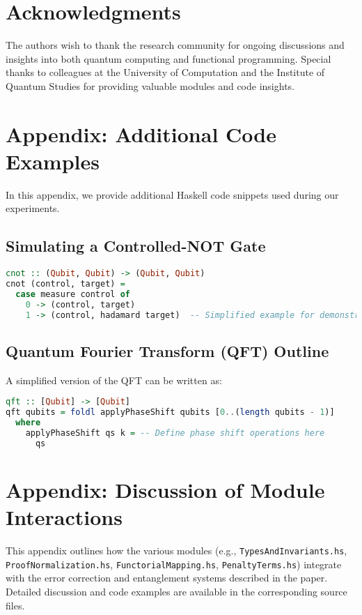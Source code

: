 \documentclass[12pt]{article}
\begin{document}
\section*{Acknowledgments}
The authors wish to thank the research community for ongoing discussions and insights into both quantum computing and functional programming. Special thanks to colleagues at the University of Computation and the Institute of Quantum Studies for providing valuable modules and code insights.





\newpage
\appendix

\section{Appendix: Additional Code Examples}
In this appendix, we provide additional Haskell code snippets used during our experiments.

\subsection{Simulating a Controlled-NOT Gate}
\begin{lstlisting}[language=Haskell]
cnot :: (Qubit, Qubit) -> (Qubit, Qubit)
cnot (control, target) =
  case measure control of
    0 -> (control, target)
    1 -> (control, hadamard target)  -- Simplified example for demonstration
\end{lstlisting}

\subsection{Quantum Fourier Transform (QFT) Outline}
A simplified version of the QFT can be written as:
\begin{lstlisting}[language=Haskell]
qft :: [Qubit] -> [Qubit]
qft qubits = foldl applyPhaseShift qubits [0..(length qubits - 1)]
  where
    applyPhaseShift qs k = -- Define phase shift operations here
      qs
\end{lstlisting}

\section{Appendix: Discussion of Module Interactions}
This appendix outlines how the various modules (e.g., \texttt{TypesAndInvariants.hs}, \texttt{ProofNormalization.hs}, \texttt{FunctorialMapping.hs}, \texttt{PenaltyTerms.hs}) integrate with the error correction and entanglement systems described in the paper. Detailed discussion and code examples are available in the corresponding source files.
\end{document}
